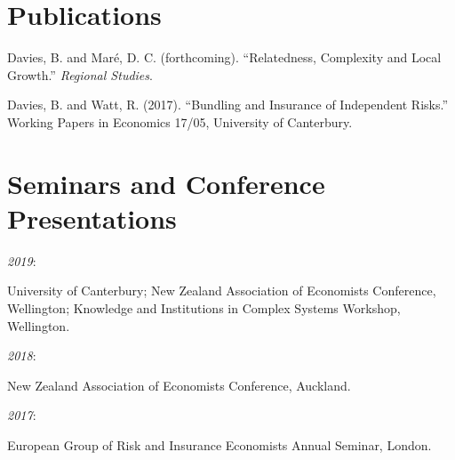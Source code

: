 \documentclass[11pt,oneside]{memoir}
\newcommand{\entry}[1]{\par\hangindent=0.4in #1}
\begin{document}
	\section{Publications}
	
		\entry{Davies, B. and Maré, D. C. (forthcoming). ``Relatedness, Complexity and Local Growth.'' \emph{Regional Studies}.}
		\entry{Davies, B. and Watt, R. (2017). ``Bundling and Insurance of Independent Risks.'' Working Papers in Economics 17/05, University of Canterbury.}
	
	\section{Seminars and Conference Presentations}
	
		\entry{\parbox[b]{0.4in}{\emph{2019}: }University of Canterbury; New Zealand Association of Economists Conference, Wellington; Knowledge and Institutions in Complex Systems Workshop, Wellington.}
		\entry{\parbox[b]{0.4in}{\emph{2018}: }New Zealand Association of Economists Conference, Auckland.}
		\entry{\parbox[b]{0.4in}{\emph{2017}: }European Group of Risk and Insurance Economists Annual Seminar, London.}
\end{document}
